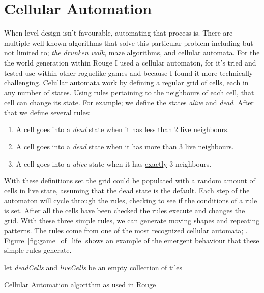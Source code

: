 \section{Cellular Automation}
When level design isn't favourable, automating that process is.
There are multiple well-known algorithms that solve this particular problem including but not limited to; \textit{the drunken walk}, maze algorithms, and cellular automata.
For the the world generation within Rouge I used a cellular automaton, for it's tried and tested use within other roguelike games and because I found it more technically challenging.
Celullar automata work by defining a regular grid of cells, each in any number of states. Using rules pertaining to the neighbours of each cell, that cell can change its state. For example; we define the states \textit{alive} and \textit{dead}. After that we define several rules:
\begin{enumerate}
	\item A cell goes into a \textit{dead} state when it has \underline{less} than 2 live neighbours.
	\item A cell goes into a \textit{dead} state when it has \underline{more} than 3 live neighbours.
	\item A cell goes into a \textit{alive} state when it has \underline{exactly} 3 neighbours.
\end{enumerate}
With these definitions set the grid could be populated with a random amount of cells in live state, assuming that the dead state is the default. Each step of the automaton will cycle through the rules, checking to see if the conditions of a rule is set. After all the cells have been checked the rules execute and changes the grid. With these three simple rules, we can generate moving shapes and repeating patterns. The rules come from one of the most recognized cellular automata; . Figure~\ref{fig:game_of_life} shows an example of the emergent behaviour that these simple rules generate.


\begin{algorithm}[p]
	let \textit{deadCells} and \textit{liveCells} be an empty collection of tiles\;
	\caption{Cellular Automation algorithm as used in Rouge}\label{alg:ca}
\end{algorithm}


